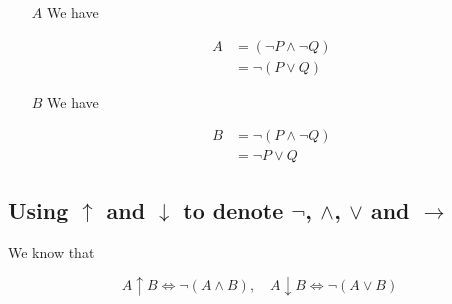 \documentclass{article}
\begin{document}
\begin{itemize}
    \item[$A$] We have

    $$
        \begin{aligned}
            A&=(\lnot P\wedge\lnot Q)\\
            &=\lnot(P\vee Q)
        \end{aligned}
    $$

    \item[$B$] We have

    $$
        \begin{aligned}
            B&=\lnot(P\wedge\lnot Q)\\
            &=\lnot P\vee Q
        \end{aligned}
    $$
    
\end{itemize}

\subsection{Using $\uparrow$ and $\downarrow$ to denote $\lnot$, $\wedge$, $\vee$ and $\to$}

We know that

$$
    A\uparrow B\Leftrightarrow \lnot(A\wedge B),\quad A\downarrow B\Leftrightarrow \lnot(A\vee B)
$$
\end{document}
